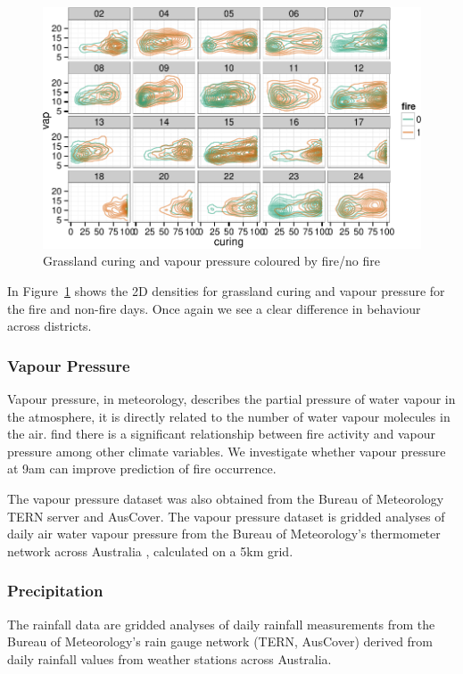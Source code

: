 \documentclass[11pt,a4paper]{article}
\begin{document}
\begin{figure}
  \centering
  \includegraphics[width=\textwidth]{figures/gv_fire.pdf}
  \caption{Grassland curing and vapour pressure coloured by fire/no fire}
  \label{fig:gv_fire}
\end{figure}

In Figure~\ref{fig:gv_fire} shows the 2D densities for grassland curing and vapour pressure for the fire and non-fire days. Once again we see a clear difference in behaviour across districts.

\subsubsection{Vapour Pressure}

Vapour pressure, in meteorology, describes the partial pressure of water vapour in the atmosphere, it is directly related to the number of water vapour molecules in the air.  \citet{harris14} find there is a significant relationship between fire activity and vapour pressure among other climate variables. We investigate whether vapour pressure at 9am can improve prediction of fire occurrence.

The vapour pressure dataset was also obtained from the Bureau of Meteorology TERN server and AusCover. The vapour pressure dataset is gridded analyses of daily air water vapour pressure from the Bureau of Meteorology's thermometer network across Australia \citep{jones09}, calculated on a 5km grid.


\subsubsection{Precipitation}

The rainfall data are gridded analyses of daily rainfall measurements from the Bureau of Meteorology's rain gauge network (TERN, AusCover) derived from daily rainfall values from weather stations across Australia.
\end{document}
